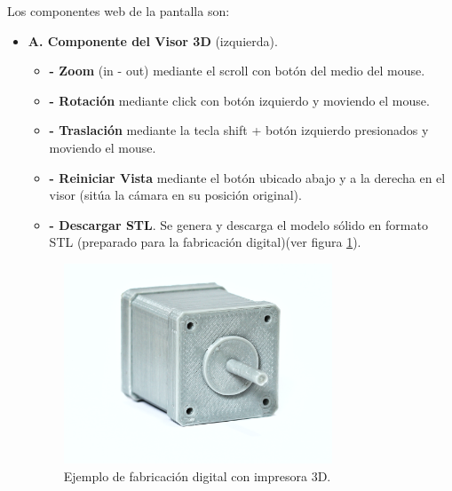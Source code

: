 Los componentes web de la pantalla son:
\begin{itemize}
\item \textbf{A. Componente del Visor 3D} (izquierda). \\


\begin{itemize}
\textbf{A1. Modelo 3D}. Se visualiza el modelo mediante OpenJSCAD y WebGL. Funcionalidades:\\
        \item \textbf{- Zoom} (in - out) mediante el scroll con botón del medio del mouse.\\
        \item \textbf{- Rotación} mediante click con botón izquierdo y moviendo el mouse.\\
        \item \textbf{- Traslación} mediante la tecla shift + botón izquierdo presionados y moviendo el mouse.\\
         \item \textbf{- Reiniciar Vista} mediante el botón ubicado abajo y a la derecha en el visor (sitúa la cámara en su posición original).\\
        \item \textbf{- Descargar STL}. Se genera y descarga el modelo sólido en formato STL (preparado para la fabricación digital)(ver figura \ref{fig:impresion3d}).
        
\end{itemize}

\begin{figure}[ht]
    \includegraphics[width=8cm]{Img/Desarrollo/impresion3d.jpg}
    \centering
    \caption{\footnotesize{Ejemplo de fabricación digital con impresora 3D.}}
     \label{fig:impresion3d}
\end{figure}


\end{itemize}
